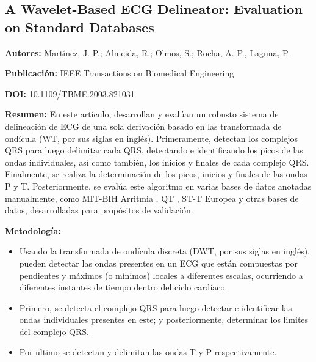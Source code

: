 \documentclass[12pt,letterpaper,oneside,openright]{book}
\begin{document}
%
%
%
%

\subsection{A Wavelet-Based ECG Delineator: Evaluation on Standard Databases \cite{Martinez04}}
\textbf{Autores:} Martínez, J. P.; Almeida, R.; Olmos, S.; Rocha, A. P., Laguna, P.

\textbf{Publicación:} IEEE Transactions on Biomedical Engineering

\textbf{DOI:} 10.1109/TBME.2003.821031

\textbf{Resumen:} En este artículo, desarrollan y evalúan un robusto sistema de delineación de ECG de una sola derivación basado en las transformada de ondícula (WT, por sus siglas en inglés). Primeramente, detectan los complejos QRS para luego delimitar cada QRS, detectando e identificando los picos de las ondas individuales, así como también, los inicios y finales de cada complejo QRS. Finalmente, se realiza la determinación de los picos, inicios y finales de las ondas P y T. Posteriormente, se evalúa este algoritmo en varias bases de datos anotadas manualmente, como MIT-BIH Arritmia \cite{arritmiadb}, QT \cite{qtdb}, ST-T Europea \cite{st-tdb} y otras bases de datos, desarrolladas para propósitos de validación.

\textbf{Metodología:} 
\begin{itemize}
	\item Usando la transformada de ondícula discreta (DWT, por sus siglas en inglés), pueden detectar las ondas presentes en un ECG que están compuestas por pendientes y máximos (o mínimos) locales a diferentes escalas, ocurriendo a diferentes instantes de tiempo dentro del ciclo cardíaco.
	\item Primero, se detecta el complejo QRS para luego detectar e identificar las ondas individuales presentes en este; y posteriormente, determinar los limites del complejo QRS.
	\item Por ultimo se detectan y delimitan las ondas T y P respectivamente.
\end{itemize}
\end{document}
